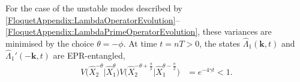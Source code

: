 For the case of the unstable modes described by \eqref{FloquetAppendix:LambdaOperatorEvolution}--\eqref{FloquetAppendix:LambdaPrimeOperatorEvolution}, these variances are minimised by the choice $\theta = -\phi$. At time $t = n T > 0$, the states $\hat{\Lambda}_1(\bm{k}, t)$ and $\hat{\Lambda}_1'(-\bm{k}, t)$ are EPR-entangled,
\begin{align}
    V\big(\hat{X}_2^{-\theta} \big| \hat{X}_1^{\theta}\big)V\big(\hat{X}_2^{-\theta + \frac{\pi}{2}} \big| \hat{X}_1^{\theta - \frac{\pi}{2}}\big) &= e^{-4 \gamma t} < 1.
\end{align}



